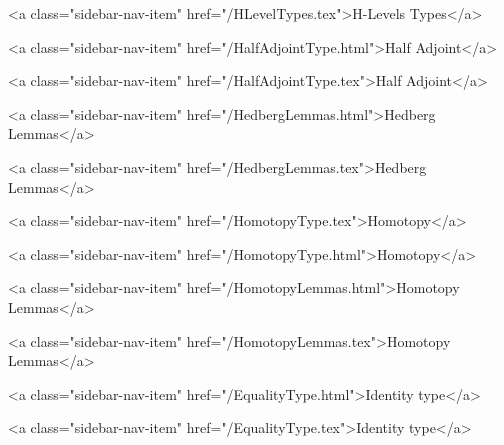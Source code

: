      
        
          <a class="sidebar-nav-item" href="/HLevelTypes.tex">H-Levels Types</a>
        
      
    
      
        
          <a class="sidebar-nav-item" href="/HalfAdjointType.html">Half Adjoint</a>
        
      
    
      
        
          <a class="sidebar-nav-item" href="/HalfAdjointType.tex">Half Adjoint</a>
        
      
    
      
        
          <a class="sidebar-nav-item" href="/HedbergLemmas.html">Hedberg Lemmas</a>
        
      
    
      
        
          <a class="sidebar-nav-item" href="/HedbergLemmas.tex">Hedberg Lemmas</a>
        
      
    
      
        
          <a class="sidebar-nav-item" href="/HomotopyType.tex">Homotopy</a>
        
      
    
      
        
          <a class="sidebar-nav-item" href="/HomotopyType.html">Homotopy</a>
        
      
    
      
        
          <a class="sidebar-nav-item" href="/HomotopyLemmas.html">Homotopy Lemmas</a>
        
      
    
      
        
          <a class="sidebar-nav-item" href="/HomotopyLemmas.tex">Homotopy Lemmas</a>
        
      
    
      
        
          <a class="sidebar-nav-item" href="/EqualityType.html">Identity type</a>
        
      
    
      
        
          <a class="sidebar-nav-item" href="/EqualityType.tex">Identity type</a>
        
      
    
